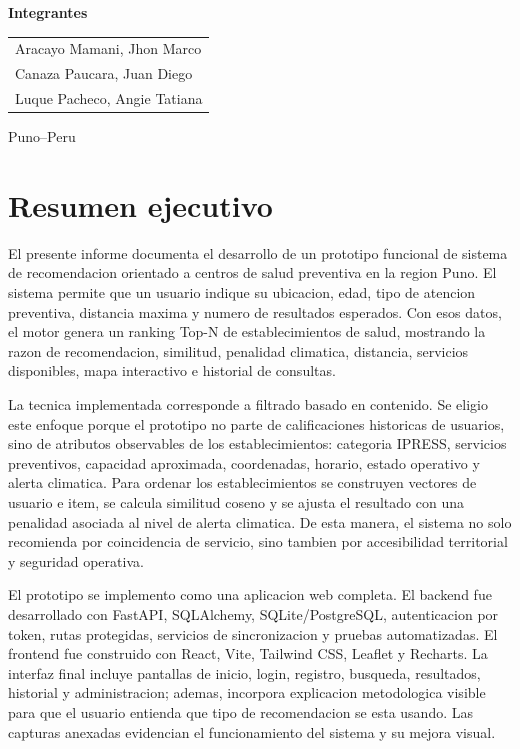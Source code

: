 \documentclass[12pt,a4paper]{article}
\begin{document}
\begin{titlepage}
\vspace{0.65cm}
{\large\bfseries Integrantes\par}
\vspace{0.2cm}
\begin{tabular}{l}
Aracayo Mamani, Jhon Marco \\
Canaza Paucara, Juan Diego \\
Luque Pacheco, Angie Tatiana \\
\end{tabular}

\vfill
{\large Puno--Peru\par}
\end{titlepage}

\hypersetup{pageanchor=true}

\section*{Resumen ejecutivo}
El presente informe documenta el desarrollo de un prototipo funcional de sistema de recomendacion orientado a centros de salud preventiva en la region Puno. El sistema permite que un usuario indique su ubicacion, edad, tipo de atencion preventiva, distancia maxima y numero de resultados esperados. Con esos datos, el motor genera un ranking Top-N de establecimientos de salud, mostrando la razon de recomendacion, similitud, penalidad climatica, distancia, servicios disponibles, mapa interactivo e historial de consultas.

La tecnica implementada corresponde a filtrado basado en contenido. Se eligio este enfoque porque el prototipo no parte de calificaciones historicas de usuarios, sino de atributos observables de los establecimientos: categoria IPRESS, servicios preventivos, capacidad aproximada, coordenadas, horario, estado operativo y alerta climatica. Para ordenar los establecimientos se construyen vectores de usuario e item, se calcula similitud coseno y se ajusta el resultado con una penalidad asociada al nivel de alerta climatica. De esta manera, el sistema no solo recomienda por coincidencia de servicio, sino tambien por accesibilidad territorial y seguridad operativa.

El prototipo se implemento como una aplicacion web completa. El backend fue desarrollado con FastAPI, SQLAlchemy, SQLite/PostgreSQL, autenticacion por token, rutas protegidas, servicios de sincronizacion y pruebas automatizadas. El frontend fue construido con React, Vite, Tailwind CSS, Leaflet y Recharts. La interfaz final incluye pantallas de inicio, login, registro, busqueda, resultados, historial y administracion; ademas, incorpora explicacion metodologica visible para que el usuario entienda que tipo de recomendacion se esta usando. Las capturas anexadas evidencian el funcionamiento del sistema y su mejora visual.
\end{document}
